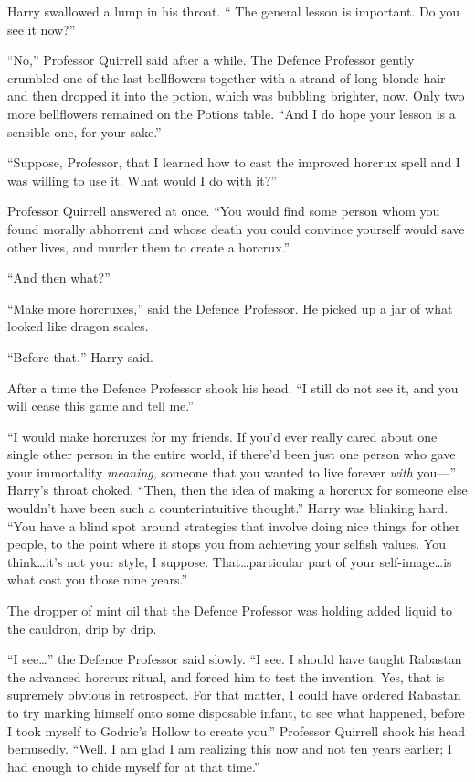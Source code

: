 Harry swallowed a lump in his throat. “ The general lesson is important. Do you see it now?”

“No,” Professor Quirrell said after a while. The Defence Professor gently crumbled one of the last bellflowers together with a strand of long blonde hair and then dropped it into the potion, which was bubbling brighter, now. Only two more bellflowers remained on the Potions table. “And I do hope your lesson is a sensible one, for your sake.”

“Suppose, Professor, that I learned how to cast the improved horcrux spell and I was willing to use it. What would I do with it?”

Professor Quirrell answered at once. “You would find some person whom you found morally abhorrent and whose death you could convince yourself would save other lives, and murder them to create a horcrux.”

“And then what?”

“Make more horcruxes,” said the Defence Professor. He picked up a jar of what looked like dragon scales.

“Before that,” Harry said.

After a time the Defence Professor shook his head. “I still do not see it, and you will cease this game and tell me.”

“I would make horcruxes for my friends. If you’d ever really cared about one single other person in the entire world, if there’d been just one person who gave your immortality \emph{meaning}, someone that you wanted to live forever \emph{with} you—” Harry’s throat choked. “Then, then the idea of making a horcrux for someone else wouldn’t have been such a counterintuitive thought.” Harry was blinking hard. “You have a blind spot around strategies that involve doing nice things for other people, to the point where it stops you from achieving your selfish values. You think…it’s not your style, I suppose. That…particular part of your self-image…is what cost you those nine years.”

The dropper of mint oil that the Defence Professor was holding added liquid to the cauldron, drip by drip.

“I see…” the Defence Professor said slowly. “I see. I should have taught Rabastan the advanced horcrux ritual, and forced him to test the invention. Yes, that is supremely obvious in retrospect. For that matter, I could have ordered Rabastan to try marking himself onto some disposable infant, to see what happened, before I took myself to Godric’s Hollow to create you.” Professor Quirrell shook his head bemusedly. “Well. I am glad I am realizing this now and not ten years earlier; I had enough to chide myself for at that time.”

